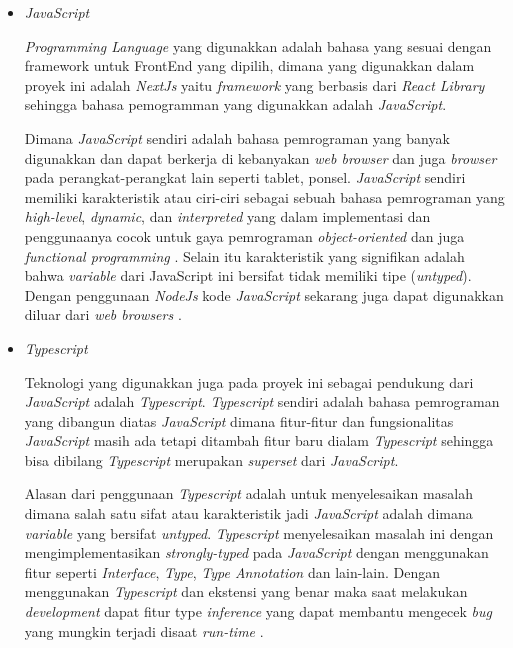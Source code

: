 \documentclass[a4paper]{article}
\begin{document}
\begin{enumerate}[label=\alph*. ]
\begin{enumerate}
                    \begin{itemize}
                        \item \textit{JavaScript}

                        \textit{Programming Language} yang digunakkan adalah bahasa yang sesuai dengan framework untuk FrontEnd yang dipilih, dimana yang digunakkan dalam proyek ini adalah \textit{NextJs} yaitu \textit{framework} yang berbasis dari \textit{React Library} sehingga bahasa pemogramman yang digunakkan adalah \textit{JavaScript}.

                        Dimana \textit{JavaScript} sendiri adalah bahasa pemrograman yang banyak digunakkan dan dapat berkerja di kebanyakan \textit{web browser} dan juga \textit{browser} pada perangkat-perangkat lain seperti tablet, ponsel. \textit{JavaScript} sendiri memiliki karakteristik atau ciri-ciri sebagai sebuah bahasa pemrograman yang \textit{high-level}, \textit{dynamic}, dan \textit{interpreted} yang dalam implementasi dan penggunaanya cocok untuk gaya pemrograman \textit{object-oriented} dan juga \textit{functional programming} . Selain itu karakteristik yang signifikan adalah bahwa \textit{variable} dari JavaScript ini bersifat tidak memiliki tipe (\textit{untyped}). Dengan penggunaan \textit{NodeJs} kode \textit{JavaScript} sekarang juga dapat digunakkan diluar dari \textit{web browsers} \autocite[38-39]{Js_book_Flanagan_2020}.

                        \item \textit{Typescript}

                        Teknologi yang digunakkan juga pada proyek ini sebagai pendukung dari \textit{JavaScript} adalah \textit{Typescript}. \textit{Typescript} sendiri adalah bahasa pemrograman yang dibangun diatas \textit{JavaScript} dimana fitur-fitur dan fungsionalitas \textit{JavaScript} masih ada tetapi ditambah fitur baru dialam \textit{Typescript} sehingga bisa dibilang \textit{Typescript} merupakan \textit{superset} dari \textit{JavaScript}.

                        Alasan dari penggunaan \textit{Typescript} adalah untuk menyelesaikan masalah dimana salah satu sifat atau karakteristik jadi \textit{JavaScript} adalah dimana \textit{variable} yang bersifat \textit{untyped}. \textit{Typescript} menyelesaikan masalah ini dengan mengimplementasikan \textit{strongly-typed} pada \textit{JavaScript} dengan menggunakan fitur seperti \textit{Interface}, \textit{Type}, \textit{Type Annotation} dan lain-lain. Dengan menggunakan \textit{Typescript} dan ekstensi yang benar maka saat melakukan \textit{development} dapat fitur type \textit{inference} yang dapat membantu mengecek \textit{bug} yang mungkin terjadi disaat \textit{run-time} \autocite{TypeScript_official}.


\end{itemize}
\end{enumerate}
\end{enumerate}
\end{document}
